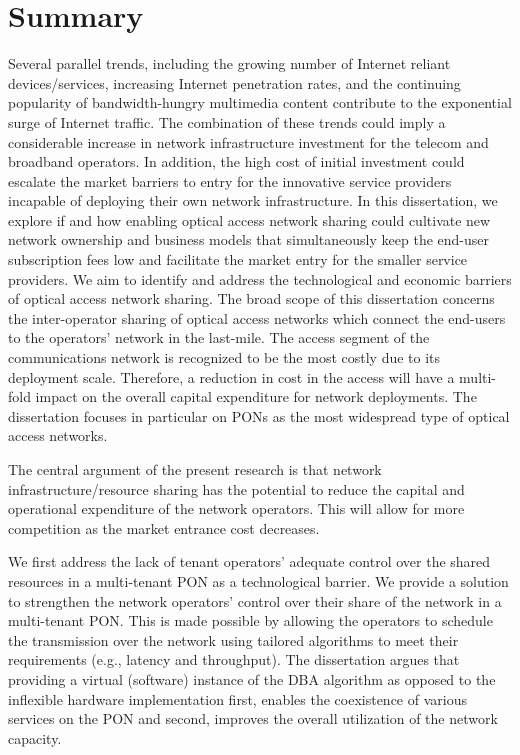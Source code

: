 \chapter*{Summary}



Several parallel trends, including the growing number of Internet reliant devices/services, increasing Internet penetration rates, and the continuing popularity of bandwidth-hungry multimedia content contribute to the exponential surge of Internet traffic. The combination of these trends could imply a considerable increase in network infrastructure investment for the telecom and broadband operators. %
In addition, the high cost of initial investment could escalate the market barriers to entry for the innovative service providers incapable of deploying their own network infrastructure. In this dissertation, we explore if and how enabling optical access network sharing could cultivate new network ownership and business models that simultaneously keep the end-user subscription fees low and facilitate the market entry for the smaller service providers. We aim to identify and address the technological and economic barriers of optical access network sharing.
The broad scope of this dissertation concerns the inter-operator sharing of optical access networks which connect the end-users to the operators' network in the last-mile. The access segment of the communications network is recognized to be the most costly due to its deployment scale. Therefore, a reduction in cost in the access will have a multi-fold impact on the overall capital expenditure for network deployments. The dissertation focuses in particular on \acp{PON} as the most widespread type of optical access networks. 

The central argument of the present research is that network infrastructure/resource sharing has the potential to reduce the capital and operational expenditure of the network operators. This will allow for more competition as the market entrance cost decreases.

We first address the lack of tenant operators' adequate control over the shared resources in a multi-tenant \ac{PON} as a technological barrier. We provide a solution to strengthen the network operators' control over their share of the network in a multi-tenant \ac{PON}. This is made possible by allowing the operators to schedule the transmission over the network using tailored algorithms to meet their requirements (e.g., latency and throughput). The dissertation argues that providing a virtual (software) instance of the \ac{DBA} algorithm as opposed to the inflexible hardware implementation first, enables the coexistence of various services on the \ac{PON} and second, improves the overall utilization of the network capacity. 


